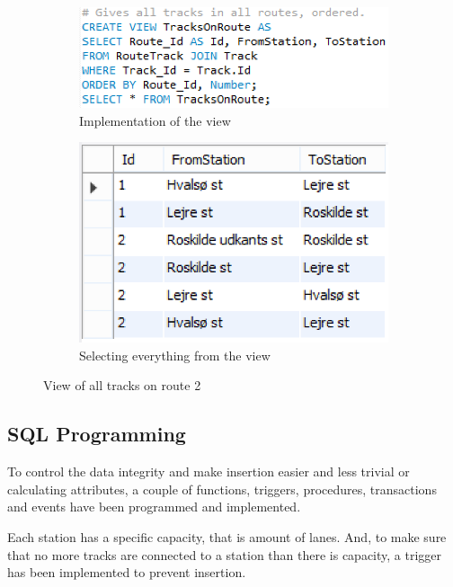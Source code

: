 \begin{figure}[h]
    \centering
    \begin{subfigure}[b]{0.45 \textwidth}
        \centering
        \includegraphics[width=\textwidth]{img/TracksOnRoute}
        \caption{Implementation of the view}
    \end{subfigure}
    \begin{subfigure}[b]{0.45 \textwidth}
        \centering
        \includegraphics{img/RouteView}
        \caption{Selecting everything from the view}
    \end{subfigure}
    \caption{View of all tracks on route 2}
    \label{fig:route}
\end{figure}

\newpage
\subsection{SQL Programming}
To control the data integrity and make insertion easier and less trivial or 
calculating attributes, a couple of functions, triggers, procedures, 
transactions and events have been programmed and implemented.

Each station has a specific capacity, that is amount of lanes. And, to make 
sure that no more tracks are connected to a station than there is capacity, a 
trigger has been implemented to prevent insertion.


